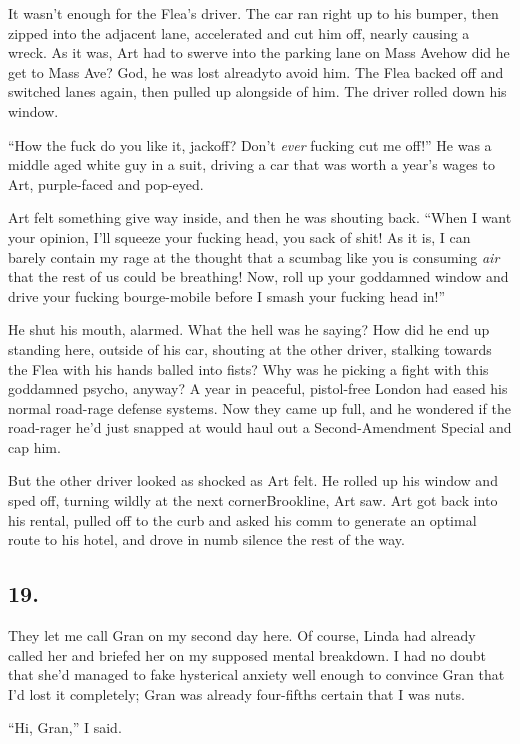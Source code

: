 It wasn’t enough for the Flea’s driver. The car ran right up to his
bumper, then zipped into the adjacent lane, accelerated and cut him
off, nearly causing a wreck. As it was, Art had to swerve into the
parking lane on Mass Ave{\dash}how did he get to Mass Ave? God, he was
lost already{\dash}to avoid him. The Flea backed off and switched lanes
again, then pulled up alongside of him. The driver rolled down his
window.

“How the fuck do you like it, jackoff? Don’t \emph{ever} fucking
cut me off!” He was a middle aged white guy in a suit, driving a
car that was worth a year’s wages to Art, purple-faced and
pop-eyed.

Art felt something give way inside, and then he was shouting back.
“When I want your opinion, I’ll squeeze your fucking head, you sack
of shit! As it is, I can barely contain my rage at the thought that
a scumbag like you is consuming \emph{air} that the rest of us
could be breathing! Now, roll up your goddamned window and drive
your fucking bourge-mobile before I smash your fucking head in!”

He shut his mouth, alarmed. What the hell was he saying? How did he
end up standing here, outside of his car, shouting at the other
driver, stalking towards the Flea with his hands balled into fists?
Why was he picking a fight with this goddamned psycho, anyway? A
year in peaceful, pistol-free London had eased his normal road-rage
defense systems. Now they came up full, and he wondered if the
road-rager he’d just snapped at would haul out a Second-Amendment
Special and cap him.

But the other driver looked as shocked as Art felt. He rolled up
his window and sped off, turning wildly at the next
corner{\dash}Brookline, Art saw. Art got back into his rental, pulled off
to the curb and asked his comm to generate an optimal route to his
hotel, and drove in numb silence the rest of the way.

\subsection{19.}

They let me call Gran on my second day here. Of course, Linda had
already called her and briefed her on my supposed mental breakdown.
I had no doubt that she’d managed to fake hysterical anxiety well
enough to convince Gran that I’d lost it completely; Gran was
already four-fifths certain that I was nuts.

“Hi, Gran,” I said.

